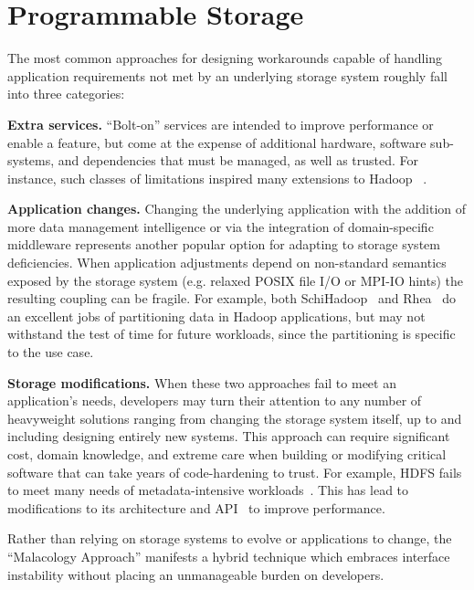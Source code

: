 \section{Programmable Storage}
\label{sec:progly}

The most common approaches for designing workarounds capable of handling
application requirements not met by an underlying storage system roughly fall
into three categories:

{\bf Extra services.} ``Bolt-on'' services are intended to improve performance
or enable a feature, but come at the expense of additional hardware, software
sub-systems, and dependencies that must be managed, as well as trusted.
For instance, such classes of limitations inspired many extensions to Hadoop
~\cite{bu:vldb2010-haloop, ekanayake:hpdc2010-twister,
ekanayake:escience2008-eglmapreduce, mihailescu:hotstorage2012-mixapart}.

{\bf Application changes.} Changing the underlying application with the addition of
 more data management intelligence or via the integration of domain-specific middleware
 represents another popular option for adapting to storage system deficiencies. 
 When application adjustments depend on non-standard semantics exposed by the storage
system (e.g. relaxed POSIX file I/O or MPI-IO hints) the resulting coupling 
can be fragile.
For example, both SchiHadoop~\cite{buck:hpc2011-scihadoop} and Rhea~\cite{gkantsidis:nsdi2013-rhea} do
an excellent jobs of partitioning data in Hadoop applications, but may not
withstand the test of time for future workloads, since the partitioning is
specific to the use case.

{\bf Storage modifications.} When these two approaches fail to meet an
application's needs, developers may turn their attention to any number of
heavyweight solutions ranging from changing the storage system itself, up to
and including designing entirely new systems. This approach can require
significant cost, domain knowledge, and extreme care when building or
modifying critical software that can take years of code-hardening to trust.
For example, HDFS fails to meet many needs 
of metadata-intensive workloads~\cite{shvachko:login2012-hdfs-scalability}.
This has lead to modifications to its architecture and API~\cite{balmin:sigmod2012-clydesdale} to improve performance.

Rather than relying on storage systems to evolve or applications to
change, the ``Malacology Approach''
manifests a hybrid technique which embraces interface instability without placing
an unmanageable burden on developers.

